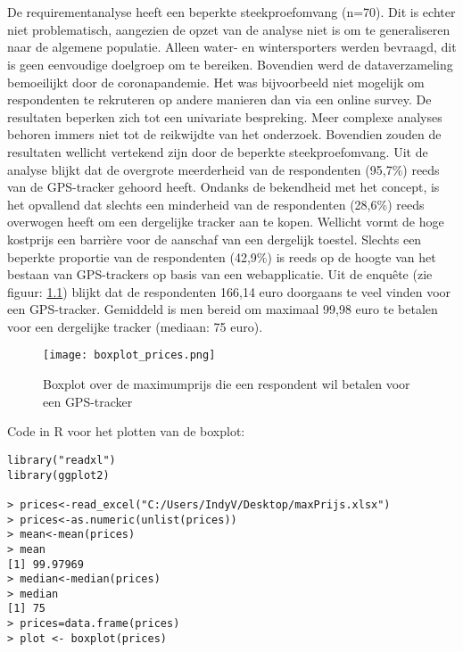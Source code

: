 \chapter{}
\label{ch:resultaten}
\section{}
De requirementanalyse heeft een beperkte steekproefomvang (n=70). Dit is echter niet problematisch, aangezien de opzet van de analyse niet is om te generaliseren naar de algemene populatie. Alleen water- en wintersporters werden bevraagd, dit is geen eenvoudige doelgroep om te bereiken. Bovendien werd de dataverzameling bemoeilijkt door de coronapandemie. Het was bijvoorbeeld niet mogelijk om respondenten te rekruteren op andere manieren dan via een online survey. De resultaten beperken zich tot een univariate bespreking. Meer complexe analyses behoren immers niet tot de reikwijdte van het onderzoek. Bovendien zouden de resultaten wellicht vertekend zijn door de beperkte steekproefomvang. Uit de analyse blijkt dat de overgrote meerderheid van de respondenten (95,7\%) reeds van de GPS-tracker gehoord heeft. Ondanks de bekendheid met het concept, is het opvallend dat slechts een minderheid van de respondenten (28,6\%) reeds overwogen heeft om een dergelijke tracker aan te kopen. Wellicht vormt de hoge kostprijs een barrière voor de aanschaf van een dergelijk toestel. Slechts een beperkte proportie van de respondenten (42,9\%) is reeds op de hoogte van het bestaan van GPS-trackers op basis van een webapplicatie. Uit de enquête (zie figuur: \ref{graph:price}) blijkt dat de respondenten 166,14 euro doorgaans te veel vinden voor een GPS-tracker. Gemiddeld is men bereid om maximaal 99,98 euro te betalen voor een dergelijke tracker (mediaan: 75 euro).
\pagebreak
\begin{figure}
	\texttt{[image: boxplot\_prices.png]}
	\caption[Boxplot maximum prijs]{Boxplot over de maximumprijs die een respondent wil betalen voor een GPS-tracker}
	\label{graph:price}
\end{figure}
\newline
Code in R voor het plotten van de boxplot:
\begin{verbatim}
library("readxl")
library(ggplot2)

> prices<-read_excel("C:/Users/IndyV/Desktop/maxPrijs.xlsx")
> prices<-as.numeric(unlist(prices))
> mean<-mean(prices)
> mean
[1] 99.97969
> median<-median(prices)
> median
[1] 75
> prices=data.frame(prices)
> plot <- boxplot(prices)
\end{verbatim}
